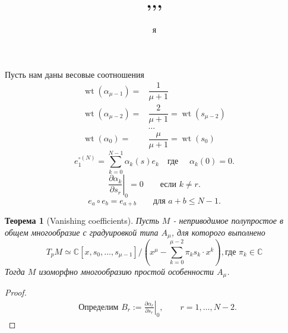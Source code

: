 \documentclass[a4paper, 10pt]{article}
\author{я}
\title{,,,}
\theoremstyle{plain}
\newtheorem{theorem}{Теорема}
\begin{document}
	\maketitle
	Пусть нам даны весовые соотношения
	\begin{align*}
		\operatorname{wt}(\alpha_{\mu - 1}) = &\dfrac{1}{\mu + 1}\\
		\operatorname{wt}(\alpha_{\mu - 2}) = &\dfrac{2}{\mu + 1} = \operatorname{wt}(s_{\mu - 2})\\
		&\dots\\
		\operatorname{wt}(\alpha_{0}) = & \dfrac{\mu}{\mu + 1} = \operatorname{wt}(s_{0})
	\end{align*}
	\begin{equation}
		e_1^{\circ(N)}
		=
		\sum_{k=0}^{N-1}\alpha_k(s)e_k \quad \text{где } \quad \alpha_k(0)=0.
		\label{eq:fundamental_relation} 
	\end{equation}
	\begin{equation}
		\left.\frac{\partial\alpha_k}{\partial s_r}\right|_0=0 \qquad\text{если }k\ne r.
		\label{eq:weight_diagonal}
	\end{equation}
	\begin{equation}
		e_a\circ e_b=e_{a+b}
		\qquad\text{для }a+b\le N-1.
		\label{eq:low_product}
	\end{equation}
	\begin{theorem}[Vanishing coefficients]
		Пусть \(M\) - неприводимое полупростое в общем многообразие с градуировкой типа \(A_\mu\), для которого выполнено
		\[
		T_pM \simeq \mathbb{C}\left[x, s_0, \dots, s_{\mu - 1}\right]/\left(x^{\mu} - \sum_{k = 0}^{\mu - 2} \pi_k s_{k} \cdot x^k\right), \text{где } \pi_k \in \mathbb{C}
		\]  Тогда \(M\) изоморфно многообразию простой особенности \(A_{\mu}\).
	\end{theorem}
	\begin{proof}
	\begin{equation}
		\begin{aligned}
			&\text{Определим }B_r:=
			\left.\frac{\partial\alpha_r}{\partial s_r}\right|_0,
			\qquad r=1,\ldots,N-2.
			\label{eq:Br_def}
		\end{aligned}
	\end{equation}
	\end{proof}
\end{document}
